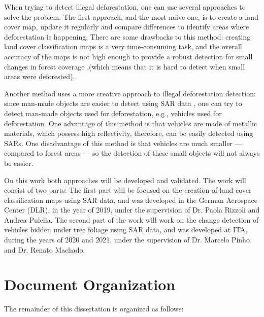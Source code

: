 When trying to detect illegal deforestation, one can use several approaches to solve the problem. The first approach, and the most naive one, is to create a land cover map, update it regularly and compare differences to identify
areas where deforestation is happening. There are some drawbacks to this method: creating land cover classification maps is a very time-consuming task, and the overall accuracy of the maps is not high enough to provide a robust detection for small changes in forest coverage \cite{Rodrigo}.(which means that it is hard to detect when small areas were deforested).

Another method uses a more creative approach to illegal deforestation detection: since man-made objects are easier to detect using SAR data \cite{manmade}, one can try to detect man-made objects used for deforestation, e.g., vehicles used for deforestation.
One advantage of this method is that vehicles are made of metallic materials, which possess high reflectivity, therefore, can be easily detected using SARs. One disadvantage of this method is that vehicles are much smaller — compared to forest areas — so the detection of these small objects will not always be easier.

On this work both approaches will be developed and validated. The work will consist of two parts: The first part will be focused on the creation of land cover classification maps
using SAR data, and was developed in the German Aerospace Center (DLR), in the year of 2019, under the supervision of Dr. Paola Rizzoli and Andrea Pulella. The second part of the work will work on the
change detection of vehicles hidden under tree foliage using SAR data, and was developed at ITA, during the years of 2020 and 2021, under the supervision of Dr. Marcelo Pinho and Dr. Renato Machado.

\section{Document Organization}
The remainder of this dissertation is organized as follows:

